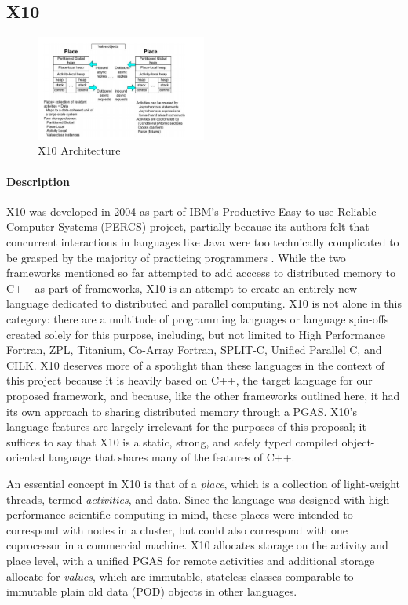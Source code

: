 \normalsize

\subsection{X10}
    \begin{figure}[ht]
		\centering
		\includegraphics[width=0.50\textwidth]{Figures/x10_arch.png}
		\caption{X10 Architecture \cite{X10_2005}}
        \label{fig:x10_arch}
    \end{figure}
	\paragraph{Description} \label{X10_desc}
X10 was developed in 2004 as part of IBM's Productive Easy-to-use Reliable Computer Systems (PERCS) project, partially because its authors felt that concurrent interactions in languages like Java were too technically complicated to be grasped by the majority of practicing programmers \cite{X10}. While the two frameworks mentioned so far attempted to add acccess to distributed memory to C++ as part of frameworks, X10 is an attempt to create an entirely new language dedicated to distributed and parallel computing. X10 is not alone in this category: there are a multitude of programming languages or language spin-offs created solely for this purpose, including, but not limited to High Performance Fortran, ZPL, Titanium, Co-Array Fortran, SPLIT-C, Unified Parallel C, and CILK. X10 deserves more of a spotlight than these languages in the context of this project because it is heavily based on C++, the target language for our proposed framework, and because, like the other frameworks outlined here, it had its own approach to sharing distributed memory through a PGAS. X10's language features are largely irrelevant for the purposes of this proposal; it suffices to say that X10 is a static, strong, and safely typed compiled object-oriented language that shares many of the features of C++. 

An essential concept in X10 is that of a \textit{place}, which is a collection of light-weight threads, termed \textit{activities}, and data. Since the language was designed with high-performance scientific computing in mind, these places were intended to correspond with nodes in a cluster, but could also correspond with one coprocessor in a commercial machine. X10 allocates storage on the activity and place level, with a unified PGAS for remote activities and additional storage allocate for \textit{values}, which are immutable, stateless classes comparable to immutable plain old data (POD) objects in other languages. 


